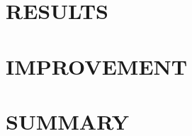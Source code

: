 \documentclass[apj, revtex4]{emulateapj}
\begin{document}
\section{RESULTS}

\section{IMPROVEMENT}
\section{SUMMARY}


\end{document}

